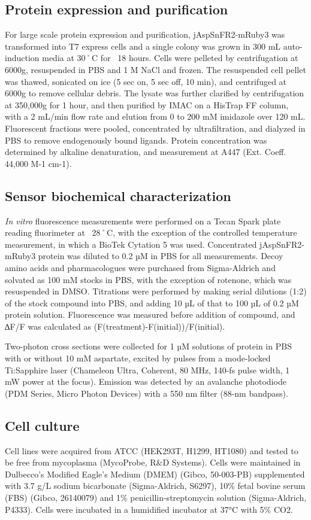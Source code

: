 \documentclass[9pt,lineno]{elife}
\begin{document}
\subsection{Protein expression and purification}
For large scale protein expression and purification, jAspSnFR2-mRuby3 was transformed into T7 express cells and a single colony was grown in 300 mL auto-induction media \citep{Studier2005-ki} at 30˚C for ~18 hours.
Cells were pelleted by centrifugation at 6000g, resuspended in PBS and 1 M NaCl and frozen.
The resuspended cell pellet was thawed, sonicated on ice (5 sec on, 5 sec off, 10 min), and centrifuged at 6000g to remove cellular debris.
The lysate was further clarified by centrifugation at 350,000g for 1 hour, and then purified by IMAC on a HisTrap FF column, with a 2 mL/min flow rate and elution from 0 to 200 mM imidazole over 120 mL.
Fluorescent fractions were pooled, concentrated by ultrafiltration, and dialyzed in PBS to remove endogenously bound ligands.
Protein concentration was determined by alkaline denaturation, and measurement at A447 (Ext. Coeff. 44,000 M-1 cm-1).

\subsection{Sensor biochemical characterization}
\textit{In vitro} fluorescence measurements were performed on a Tecan Spark plate reading fluorimeter at ~28˚C, with the exception of the controlled temperature measurement, in which a BioTek Cytation 5 was used.
Concentrated jAspSnFR2-mRuby3 protein was diluted to 0.2 µM in PBS for all measurements.
Decoy amino acids and pharmacologues were purchased from Sigma-Aldrich and solvated as 100 mM stocks in PBS, with the exception of rotenone, which was resuspended in DMSO.
Titrations were performed by making serial dilutions (1:2) of the stock compound into PBS, and adding 10 µL of that to 100 µL of 0.2 µM protein solution.
Fluorescence was measured before addition of compound, and ∆F/F was calculated as (F(treatment)-F(initial))/F(initial).

Two-photon cross sections were collected for 1 µM solutions of protein in PBS with or without 10 mM aspartate, excited by pulses from a mode-locked Ti:Sapphire laser (Chameleon Ultra, Coherent, 80 MHz, 140-fs pulse width, 1 mW power at the focus).
Emission was detected by an avalanche photodiode (PDM Series, Micro Photon Devices) with a 550 nm filter (88-nm bandpass).

\subsection{Cell culture}
Cell lines were acquired from ATCC (HEK293T, H1299, HT1080) and tested to be free from mycoplasma (MycoProbe, R\&D Systems).
Cells were maintained in Dulbecco’s Modified Eagle’s Medium (DMEM) (Gibco, 50-003-PB) supplemented with 3.7 g/L sodium bicarbonate (Sigma-Aldrich, S6297), 10\% fetal bovine serum (FBS) (Gibco, 26140079) and 1\% penicillin-streptomycin solution (Sigma-Aldrich, P4333).
Cells were incubated in a humidified incubator at 37°C with 5\% CO2.
\end{document}
